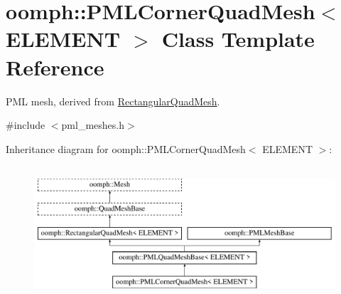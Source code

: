 \hypertarget{classoomph_1_1PMLCornerQuadMesh}{}\section{oomph\+:\+:P\+M\+L\+Corner\+Quad\+Mesh$<$ E\+L\+E\+M\+E\+NT $>$ Class Template Reference}
\label{classoomph_1_1PMLCornerQuadMesh}


P\+ML mesh, derived from \hyperlink{classoomph_1_1RectangularQuadMesh}{Rectangular\+Quad\+Mesh}.  




{\ttfamily \#include $<$pml\+\_\+meshes.\+h$>$}

Inheritance diagram for oomph\+:\+:P\+M\+L\+Corner\+Quad\+Mesh$<$ E\+L\+E\+M\+E\+NT $>$\+:\begin{figure}[H]
\begin{center}
\leavevmode
\includegraphics[height=5.000000cm]{classoomph_1_1PMLCornerQuadMesh}
\end{center}
\end{figure}
